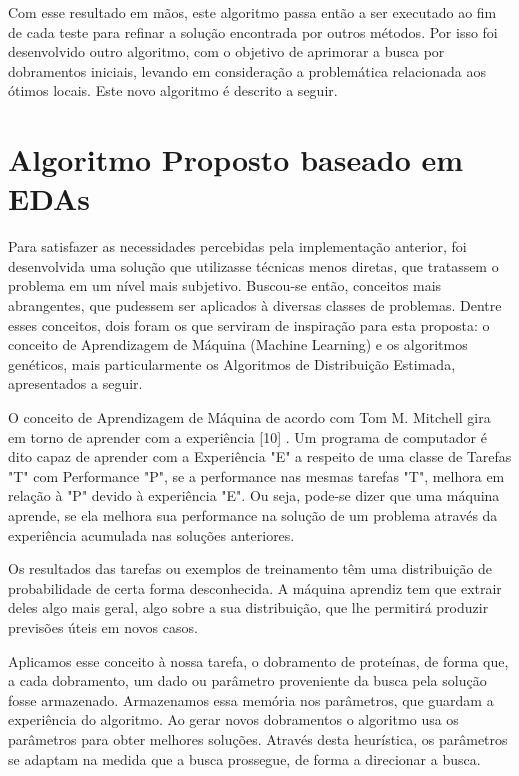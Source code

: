 \documentclass[dm,ppgcomp]{texfurg}
\begin{document}
Com esse resultado em mãos, este algoritmo passa então a ser executado ao fim de cada teste para refinar a solução encontrada por outros métodos. Por isso foi desenvolvido outro algoritmo, com o objetivo de aprimorar a busca por dobramentos iniciais, levando em consideração a problemática relacionada aos ótimos locais. Este novo algoritmo é descrito a seguir.

\chapter{Algoritmo Proposto baseado em EDAs}

Para satisfazer as necessidades percebidas pela implementação anterior, foi desenvolvida uma solução que utilizasse técnicas menos diretas, que tratassem o problema em um nível mais subjetivo. Buscou-se então, conceitos mais abrangentes, que pudessem ser aplicados à diversas classes de problemas. Dentre esses conceitos, dois foram os que serviram de inspiração para esta proposta: o conceito de  Aprendizagem de Máquina (Machine Learning) e os algoritmos genéticos, mais particularmente os Algoritmos de Distribuição Estimada, apresentados a seguir.
 
O conceito de Aprendizagem de Máquina de acordo com Tom M. Mitchell gira em torno de aprender com a experiência [10] . Um programa de computador é dito capaz de  aprender com a Experiência "E" a respeito de uma classe de Tarefas "T" com Performance "P", se a performance nas mesmas tarefas "T", melhora em relação à "P" devido à experiência "E". Ou seja, pode-se dizer que uma máquina aprende, se ela melhora sua performance na solução de um problema através da experiência acumulada nas soluções anteriores. 

Os resultados das tarefas ou exemplos de treinamento têm uma distribuição de probabilidade de certa forma desconhecida. A máquina aprendiz tem que extrair deles algo mais geral, algo sobre a sua distribuição, que lhe permitirá produzir previsões úteis em novos casos.

Aplicamos esse conceito à nossa tarefa, o dobramento de proteínas, de forma que, a cada dobramento, um dado ou parâmetro proveniente da busca pela solução fosse armazenado. Armazenamos essa memória nos parâmetros, que guardam a experiência do algoritmo. Ao gerar novos dobramentos o algoritmo usa os parâmetros para obter melhores soluções. Através desta heurística, os parâmetros se adaptam na medida que a busca prossegue, de forma a direcionar a busca. 
\end{document}
